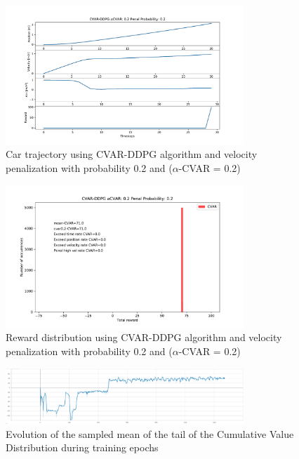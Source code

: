\begin{figure}[ht]
        \centering
        \includegraphics[width=0.8\textwidth]{images/CVAR/Trajectory_CVAR_ppenal02.pdf}
        \caption{Car trajectory using CVAR-DDPG algorithm and velocity penalization with probability 0.2 and ($\alpha$-CVAR = 0.2)}
        \label{traj_cvar_ddpg_probpenal0.2_cvar0.2}
    
\end{figure}

\begin{figure}[ht]
        \centering
        \includegraphics[width=0.8\textwidth]{images/CVAR/Rewards_CVAR_ppenal02.pdf}
        \caption{Reward distribution using CVAR-DDPG algorithm and velocity penalization with probability 0.2 and ($\alpha$-CVAR = 0.2)}
        \label{rew_cvar_ddpg_probpenal0.2_cvar0.2}
    
\end{figure}
\begin{figure}[ht]
        \centering
        \includegraphics[width=0.8\textwidth]{images/CVAR/Cvar_evol.png}
        \caption{Evolution of the sampled mean of the tail of the Cumulative Value Distribution during training epochs}
        \label{tail_CDF_EVOL}
    
\end{figure}







